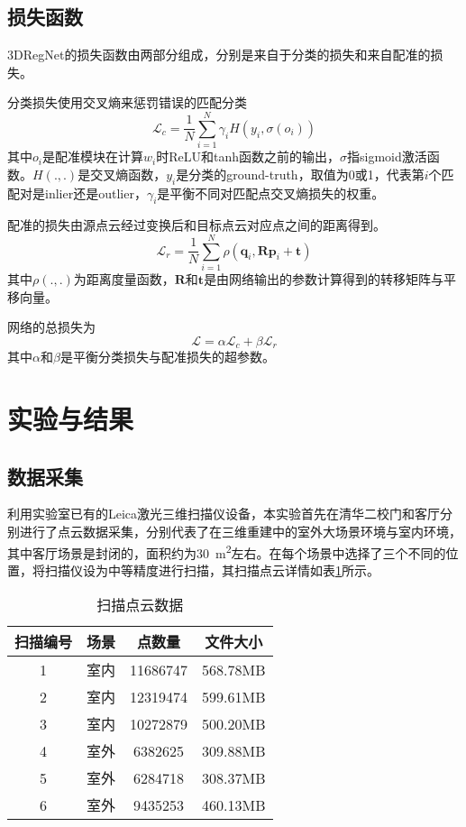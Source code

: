 \subsection{损失函数}
3DRegNet的损失函数由两部分组成，分别是来自于分类的损失和来自配准的损失。

分类损失使用交叉熵来惩罚错误的匹配分类
\begin{equation}
	\mathcal{L}_c=\frac{1}{N}\sum_{i=1}^{N}\gamma_i H \left(y_i, \sigma(o_i)\right)
\end{equation}
其中$o_i$是配准模块在计算$w_i$时ReLU和tanh函数之前的输出，$\sigma$指sigmoid激活函数。$H(.,.)$是交叉熵函数，$y_i$是分类的ground-truth，取值为0或1，代表第$i$个匹配对是inlier还是outlier，$\gamma_i$是平衡不同对匹配点交叉熵损失的权重。

配准的损失由源点云经过变换后和目标点云对应点之间的距离得到。
\begin{equation}
	\mathcal{L}_r = \frac{1}{N}\sum_{i=1}^{N} \rho \left(\boldsymbol{q}_i, \boldsymbol{R}\boldsymbol{p}_i+\boldsymbol{t} \right)
\end{equation}
其中$\rho(.,.)$为距离度量函数，$\boldsymbol{R}$和$\boldsymbol{t}$是由网络输出的参数计算得到的转移矩阵与平移向量。

网络的总损失为
\begin{equation}
	\mathcal{L} = \alpha \mathcal{L}_c + \beta \mathcal{L}_r
\end{equation}
其中$\alpha$和$\beta$是平衡分类损失与配准损失的超参数。

\section{实验与结果}
\subsection{数据采集}
利用实验室已有的Leica激光三维扫描仪设备，本实验首先在清华二校门和客厅分别进行了点云数据采集，分别代表了在三维重建中的室外大场景环境与室内环境，其中客厅场景是封闭的，面积约为\SI{30}{m^2}左右。在每个场景中选择了三个不同的位置，将扫描仪设为中等精度进行扫描，其扫描点云详情如表\ref{blk360-data}所示。

\begin{table}
	\centering
	\caption{扫描点云数据}
	\label{blk360-data}
	\begin{tabular}{cccc}
		\toprule
		扫描编号 & 场景 & 点数量 & 文件大小 \\
		\midrule
		1 & 室内 & 11686747 & 568.78MB \\
		2 & 室内 & 12319474 & 599.61MB \\
		3 & 室内 & 10272879 & 500.20MB \\
		4 & 室外 & 6382625  & 309.88MB \\
		5 & 室外 & 6284718  & 308.37MB \\
		6 & 室外 & 9435253  & 460.13MB \\
		\bottomrule
	\end{tabular}
\end{table}

